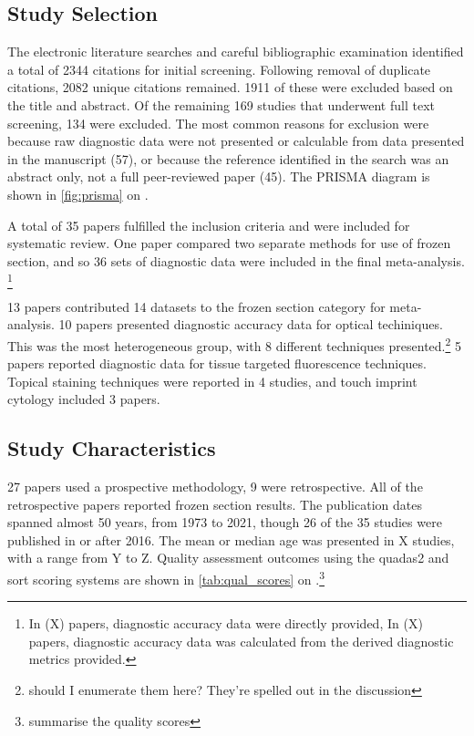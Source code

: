 \subsection{Study Selection}

The electronic literature searches and careful bibliographic examination identified a total of 2344 citations for initial screening.
Following removal of duplicate citations, 2082 unique citations remained.
1911 of these were excluded based on the title and abstract.
Of the remaining 169 studies that underwent full text screening, 134 were excluded.
The most common reasons for exclusion were because raw diagnostic data were not presented or calculable from data presented in the manuscript (57), or because the reference identified in the search was an abstract only, not a full peer-reviewed paper (45).
The PRISMA diagram is shown in \cref{fig:prisma} on .

A total of 35 papers fulfilled the inclusion criteria and were included for systematic review.
One paper \cite{amitImprovingRateNegative2016} compared two separate methods for use of frozen section, and so 36 sets of diagnostic data were included in the final meta-analysis.
\footnote{In (X) papers, diagnostic accuracy data were directly provided, In (X) papers, diagnostic accuracy data was calculated from the derived diagnostic metrics provided.}

13 papers contributed 14 datasets to the frozen section category for meta-analysis.
10 papers presented diagnostic accuracy data for optical techiniques.
This was the most heterogeneous group, with 8 different techniques presented.\footnote{should I enumerate them here? They're spelled out in the discussion}
5 papers reported diagnostic data for tissue targeted fluorescence techniques.
Topical staining techniques were reported in 4 studies, and touch imprint cytology included 3 papers.

\subsection{Study Characteristics}
27 papers used a prospective methodology, 9 were retrospective.
All of the retrospective papers reported frozen section results.
The publication dates spanned almost 50 years, from 1973 to 2021, though 26 of the 35 studies were published in or after 2016.
The mean or median age was presented in X studies, with a range from Y to Z.
Quality assessment outcomes using the \gls{quadas2} and \gls{sort} scoring systems are shown in \cref{tab:qual_scores} on .\footnote{summarise the quality scores}






